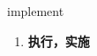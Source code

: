 
\begin{frame}
{\huge implement}
\begin{center}
\begin{enumerate}\Large
  \item \textbf{执行，实施}
\end{enumerate}
\end{center}
\end{frame}
